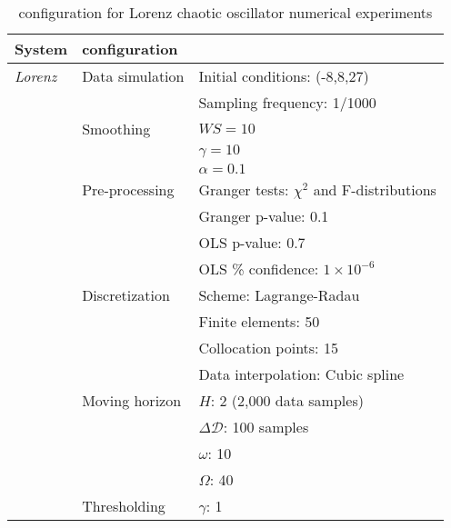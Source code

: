 \documentclass[12pt]{article}
\begin{document}
\begin{table}[htb]
\caption{\ours{} configuration for Lorenz chaotic oscillator numerical experiments}
\vspace{-0.2in}
\label{tb:L_dysmo}
\begin{center}
\begin{tabular}{l l l}
\hline
\textbf{System}  &  \textbf{\ours{} configuration} &  \\
\hline
\hline
\textit{Lorenz}  & {Data simulation} & Initial conditions: (-8,8,27)	\\
 & & Sampling frequency: 1/1000  \\
 &  {Smoothing} 	& $WS=10$   \\
 & & $\gamma=10$   \\
 & & $\alpha=0.1$   \\
 & {Pre-processing} & Granger tests: $\chi^2$ and F-distributions \\
 &  & Granger p-value: 0.1 \\
 & & OLS p-value: 0.7 \\
 & & OLS \% confidence: $1\times 10^{-6}$ \\
 & {Discretization} & Scheme: Lagrange-Radau \\
 & & Finite elements: 50 \\
 & & Collocation points: 15 \\
 & & Data interpolation: Cubic spline  \\
 & {Moving horizon} & $H$: 2 (2,000 data samples) \\
 & & $\Delta \mathcal{D}$: 100 samples \\
 & & $\omega$: 10 \\
 & & $\Omega$: 40 \\
 & {Thresholding} & $\gamma$: 1 \\
\hline
\end{tabular}
\end{center}
\end{table}
\end{document}
